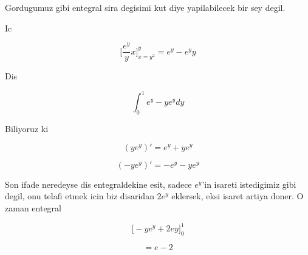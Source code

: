 \documentclass[12pt,fleqn]{article}
\begin{document}
Gordugumuz gibi entegral sira degisimi kut diye yapilabilecek bir sey
degil. 

Ic

\[ \bigg[ \frac{e^y}{y}x \bigg]_{x=y^2}^{y} = 
e^y - e^yy
\]

Dis

\[ \int_0^1 e^y - ye^y dy  \]

Biliyoruz ki 

\[ (ye^y)' = e^y + ye^y \]

\[ (-ye^y)' = -e^y - ye^y \]

Son ifade neredeyse dis entegraldekine esit, sadece $e^y$'in isareti
istedigimiz gibi degil, onu telafi etmek icin biz disaridan $2e^y$
eklersek, eksi isaret artiya doner. O zaman entegral 

\[ \bigg[ -ye^y + 2ey \bigg]_0^1 \]

\[ = e - 2 \]
\end{document}
